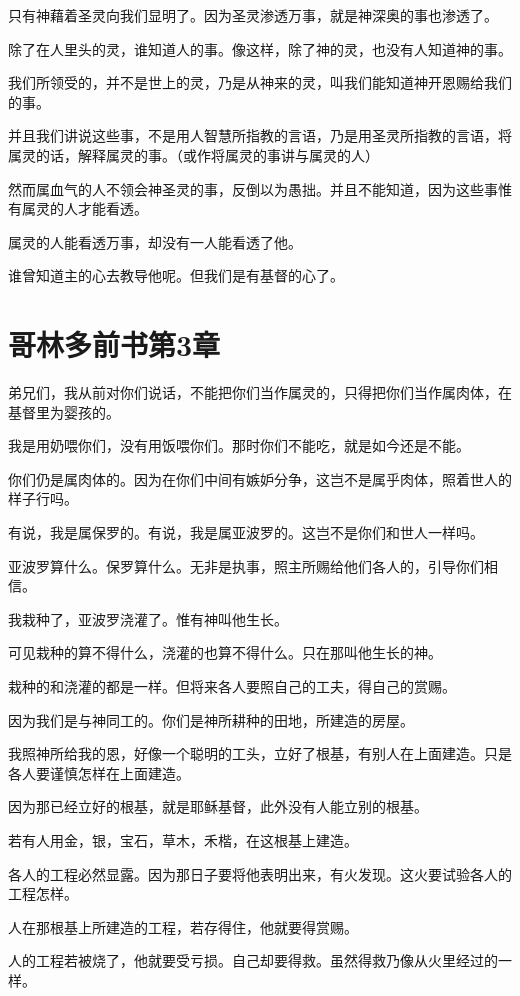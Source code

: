 \documentclass[12pt,oneside]{book}
\begin{document}
只有神藉着圣灵向我们显明了。因为圣灵渗透万事，就是神深奥的事也渗透了。

除了在人里头的灵，谁知道人的事。像这样，除了神的灵，也没有人知道神的事。

我们所领受的，并不是世上的灵，乃是从神来的灵，叫我们能知道神开恩赐给我们的事。

并且我们讲说这些事，不是用人智慧所指教的言语，乃是用圣灵所指教的言语，将属灵的话，解释属灵的事。（或作将属灵的事讲与属灵的人）

然而属血气的人不领会神圣灵的事，反倒以为愚拙。并且不能知道，因为这些事惟有属灵的人才能看透。

属灵的人能看透万事，却没有一人能看透了他。

谁曾知道主的心去教导他呢。但我们是有基督的心了。

\chapter{哥林多前书第3章}
弟兄们，我从前对你们说话，不能把你们当作属灵的，只得把你们当作属肉体，在基督里为婴孩的。

我是用奶喂你们，没有用饭喂你们。那时你们不能吃，就是如今还是不能。

你们仍是属肉体的。因为在你们中间有嫉妒分争，这岂不是属乎肉体，照着世人的样子行吗。

有说，我是属保罗的。有说，我是属亚波罗的。这岂不是你们和世人一样吗。

亚波罗算什么。保罗算什么。无非是执事，照主所赐给他们各人的，引导你们相信。

我栽种了，亚波罗浇灌了。惟有神叫他生长。

可见栽种的算不得什么，浇灌的也算不得什么。只在那叫他生长的神。

栽种的和浇灌的都是一样。但将来各人要照自己的工夫，得自己的赏赐。

因为我们是与神同工的。你们是神所耕种的田地，所建造的房屋。

我照神所给我的恩，好像一个聪明的工头，立好了根基，有别人在上面建造。只是各人要谨慎怎样在上面建造。

因为那已经立好的根基，就是耶稣基督，此外没有人能立别的根基。

若有人用金，银，宝石，草木，禾楷，在这根基上建造。

各人的工程必然显露。因为那日子要将他表明出来，有火发现。这火要试验各人的工程怎样。

人在那根基上所建造的工程，若存得住，他就要得赏赐。

人的工程若被烧了，他就要受亏损。自己却要得救。虽然得救乃像从火里经过的一样。
\end{document}

